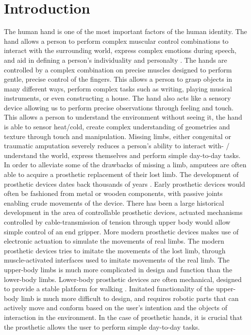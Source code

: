 \documentclass[../main.tex]{subfiles}
\begin{document}
\section{Introduction}

The human hand is one of the most important factors of the human identity.
The hand allows a person to perform complex muscular control combinations to interact with the surrounding world, express complex emotions during speech, and aid in defining a person's individuality and personalty \cite{Douglashands}.
The hands are controlled by a complex combination on precise muscles designed to perform gentle, precise control of the fingers.
This allows a person to grasp objects in many different ways, perform complex tasks such as writing, playing musical instruments, or even constructing a house.
The hand also acts like a sensory device allowing us to perform precise observations through feeling and touch.
This allows a person to understand the environment without seeing it, the hand is able to sensor heat/cold, create complex understanding of geometries and texture through touch and manipulation.
Missing limbs, either \gls{congenital} or \gls{traumatic} amputation severely reduces a person's ability to interact with- / understand the world, express themselves and perform simple day-to-day tasks.
In order to alleviate some of the drawbacks of missing a limb, amputees are often able to acquire a prosthetic replacement of their lost limb.
The development of prosthetic devices dates back thousands of years \cite{Kevin2014}.
Early prosthetic devices would often be fashioned from metal or wooden components, with passive joints enabling crude movements of the device. 
There has been a large historical development in the area of controllable prosthetic devices, actuated mechanisms controlled by cable-transmission of tension through upper body would allow simple control of an end gripper.
More modern prosthetic devices makes use of electronic actuation to simulate the movements of real limbs.
The modern prosthetic devices tries to imitate the movements of the lost limb, through muscle-activated interfaces used to imitate movements of the real limb. 
The upper-body limbs is much more complicated in design and function than the lower-body limbs.
Lower-body prosthetic devices are often mechanical, designed to provide a stable platform for walking \cite{mechanicallegs}.
Imitated functionality of the upper-body limb is much more difficult to design, and requires robotic parts that can actively move and conform based on the user's intention and the objects of interaction in the environment.  
In the case of prosthetic hands, it is crucial that the prosthetic allows the user to perform simple day-to-day tasks.
\end{document}
